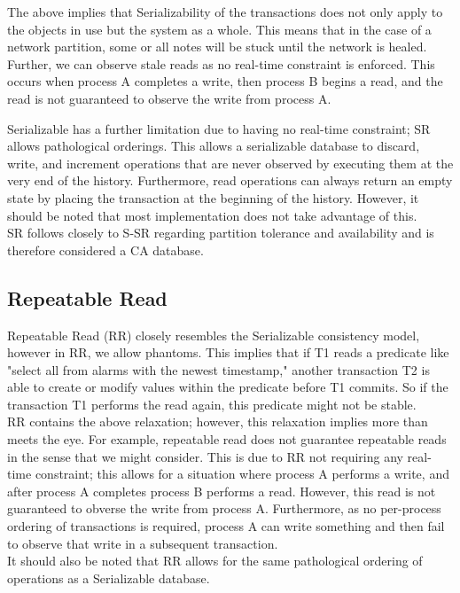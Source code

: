 \documentclass[a4paper,10pt,titlepage]{report}
\begin{document}
The above implies that Serializability of the transactions does not only apply to the objects in use but the system as a whole. This means that in the case of a network partition, some or all notes will be stuck until the network is healed. Further, we can observe stale reads as no real-time constraint is enforced. This occurs when process A completes a write, then process B begins a read, and the read is not guaranteed to observe the write from process A.
\\ \vspace{5mm}

Serializable has a further limitation due to having no real-time constraint; SR allows pathological orderings. This allows a serializable database to discard, write, and increment operations that are never observed by executing them at the very end of the history. Furthermore, read operations can always return an empty state by placing the transaction at the beginning of the history. However, it should be noted that most implementation does not take advantage of this.
\\ \vspace{5mm}
SR follows closely to S-SR regarding partition tolerance and availability and is therefore considered a CA database.
\\ \vspace{5mm}
\vspace{2mm}

\vspace{2mm}
\newpage
\subsection{Repeatable Read}

Repeatable Read (RR) closely resembles the Serializable consistency model, however in RR, we allow phantoms. This implies that if T1 reads a predicate like "select all from alarms with the newest timestamp," another transaction T2 is able to create or modify values within the predicate before T1 commits. So if the transaction T1 performs the read again, this predicate might not be stable.
\\ \vspace{5mm}
RR contains the above relaxation; however, this relaxation implies more than meets the eye. For example, repeatable read does not guarantee repeatable reads in the sense that we might consider. This is due to RR not requiring any real-time constraint; this allows for a situation where process A performs a write, and after process A completes process B performs a read. However, this read is not guaranteed to obverse the write from process A. Furthermore, as no per-process ordering of transactions is required, process A can write something and then fail to observe that write in a subsequent transaction.
\\ \vspace{5mm}
It should also be noted that RR allows for the same pathological ordering of operations as a Serializable database.
\vspace{2mm}

\vspace{2mm}
\end{document}
